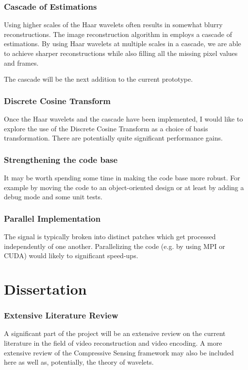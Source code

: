 \documentclass[final,3p]{report}
\begin{document}
\subsubsection{Cascade of Estimations}
Using higher scales of the Haar wavelets often results in somewhat blurry reconstructions.
The image reconstruction algorithm in \cite{pilikos2014} employs a cascade of estimations.
By using Haar wavelets at multiple scales in a cascade, we are able to achieve sharper reconstructions while also filling all the missing pixel values and frames.

The cascade will be the next addition to the current prototype.

\subsubsection{Discrete Cosine Transform}
Once the Haar wavelets and the cascade have been implemented, I would like to explore the use of the Discrete Cosine Transform as a choice of basis transformation. 
There are potentially quite significant performance gains.

\subsubsection{Strengthening the code base}
It may be worth spending some time in making the code base more robust.
For example by moving the code to an object-oriented design or at least by adding a debug mode and some unit tests.

\subsubsection{Parallel Implementation}
The signal is typically broken into distinct patches which get processed independently of one another.
Parallelizing the code (e.g. by using MPI or CUDA) would likely to significant speed-ups.

\section{Dissertation}
\subsubsection{Extensive Literature Review}
A significant part of the project will be an extensive review on the current literature in the field of video reconstruction and video encoding.
A more extensive review of the Compressive Sensing framework may also be included here as well as, potentially, the theory of wavelets. 
\end{document}
